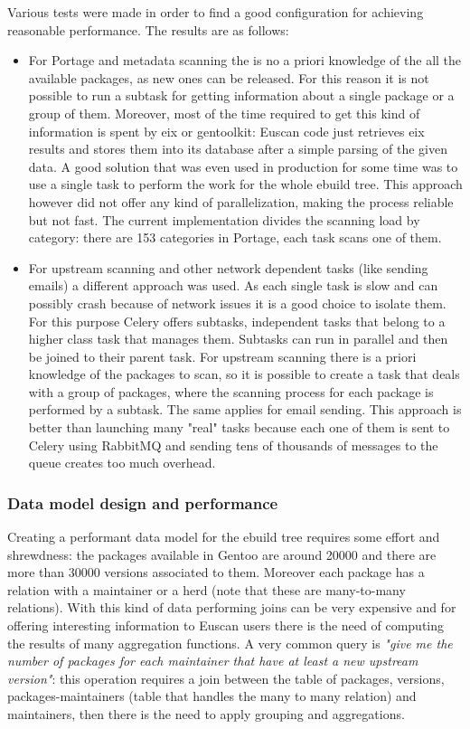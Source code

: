 Various tests were made in order to find a good configuration for achieving reasonable performance. The results are as follows:
\begin{itemize}
\item For Portage and metadata scanning the is no a priori knowledge of the all the available packages, as new ones can be released. For this reason it is not possible to run a subtask for getting information about a single package or a group of them. Moreover, most of the time required to get this kind of information is spent by eix or gentoolkit: Euscan code just retrieves eix results and stores them into its database after a simple parsing of the given data. A good solution that was even used in production for some time was to use a single task to perform the work for the whole ebuild tree. This approach however did not offer any kind of parallelization, making the process reliable but not fast. The current implementation divides the scanning load by category: there are 153 categories in Portage, each task scans one of them.

\item For upstream scanning and other network dependent tasks (like sending emails) a different approach was used. As each single task is slow and can possibly crash because of network issues it is a good choice to isolate them. For this purpose Celery offers subtasks, independent tasks that belong to a higher class task that manages them. Subtasks can run in parallel and then be joined to their parent task.
For upstream scanning there is a priori knowledge of the packages to scan, so it is possible to create a task that deals with a group of packages, where the scanning process for each package is performed by a subtask. The same applies for email sending.
This approach is better than launching many "real" tasks because each one of them is sent to Celery using RabbitMQ and sending tens of thousands of messages to the queue creates too much overhead.
\end{itemize}

\subsubsection{Data model design and performance}
Creating a performant data model for the ebuild tree requires some effort and shrewdness: the packages available in Gentoo are around 20000 and there are more than 30000 versions associated to them. Moreover each package has a relation with a maintainer or a herd (note that these are many-to-many relations). With this kind of data performing joins can be very expensive and for offering interesting information to Euscan users there is the need of computing the results of many aggregation functions. A very common query is \emph{"give me the number of packages for each maintainer that have at least a new upstream version"}: this operation requires a join between the table of packages, versions, packages-maintainers (table that handles the many to many relation) and maintainers, then there is the need to apply grouping and aggregations.

